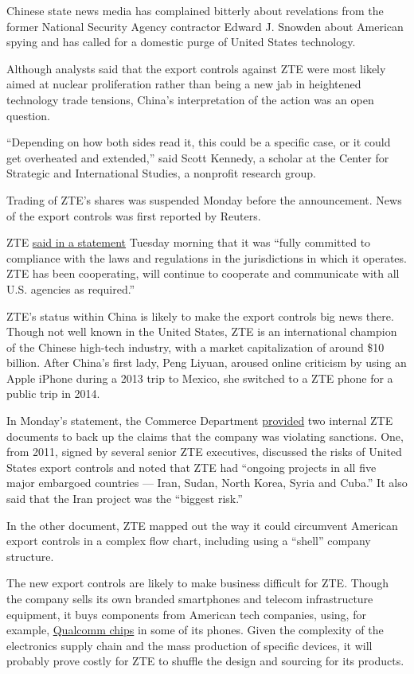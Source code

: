 Chinese state news media has complained bitterly about revelations from
the former National Security Agency contractor Edward J. Snowden about
American spying and has called for a domestic purge of United States
technology.

Although analysts said that the export controls against ZTE were most
likely aimed at nuclear proliferation rather than being a new jab in
heightened technology trade tensions, China's interpretation of the
action was an open question.

``Depending on how both sides read it, this could be a specific case, or
it could get overheated and extended,'' said Scott Kennedy, a scholar at
the Center for Strategic and International Studies, a nonprofit research
group.

Trading of ZTE's shares was suspended Monday before the announcement.
News of the export controls was first reported by Reuters.

ZTE
\href{http://wwwen.zte.com.cn/en/press_center/news/201603/t20160308_448866.html}{said
in a statement} Tuesday morning that it was ``fully committed to
compliance with the laws and regulations in the jurisdictions in which
it operates. ZTE has been cooperating, will continue to cooperate and
communicate with all U.S. agencies as required.''

ZTE's status within China is likely to make the export controls big news
there. Though not well known in the United States, ZTE is an
international champion of the Chinese high-tech industry, with a market
capitalization of around \$10 billion. After China's first lady, Peng
Liyuan, aroused online criticism by using an Apple iPhone during a 2013
trip to Mexico, she switched to a ZTE phone for a public trip in 2014.

In Monday's statement, the Commerce Department
\href{http://www.bis.doc.gov/index.php/about-bis/newsroom}{provided} two
internal ZTE documents to back up the claims that the company was
violating sanctions. One, from 2011, signed by several senior ZTE
executives, discussed the risks of United States export controls and
noted that ZTE had ``ongoing projects in all five major embargoed
countries --- Iran, Sudan, North Korea, Syria and Cuba.'' It also said
that the Iran project was the ``biggest risk.''

In the other document, ZTE mapped out the way it could circumvent
American export controls in a complex flow chart, including using a
``shell'' company structure.

The new export controls are likely to make business difficult for ZTE.
Though the company sells its own branded smartphones and telecom
infrastructure equipment, it buys components from American tech
companies, using, for example,
\href{https://www.qualcomm.com/products/snapdragon/zte}{Qualcomm chips}
in some of its phones. Given the complexity of the electronics supply
chain and the mass production of specific devices, it will probably
prove costly for ZTE to shuffle the design and sourcing for its
products.

